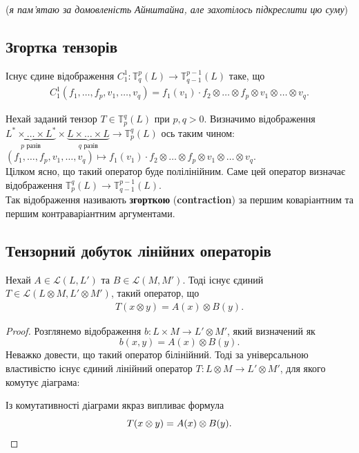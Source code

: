 \documentclass{math_library}
\begin{document}
(\textit{я пам'ятаю за домовленість Айнштайна, але захотілось підкреслити цю суму})

\subsection{Згортка тензорів}
\begin{proposition}
Існує єдине відображення $C_1^1 \colon \mathbb{T}_q^p(L) \to \mathbb{T}_{q-1}^{p-1}(L)$ таке, що
\begin{align*}
C_1^1(f_1,\dots,f_p,v_1,\dots,v_q) = f_1(v_1) \cdot f_2 \otimes \dots \otimes f_p \otimes v_1 \otimes \dots \otimes v_q.
\end{align*}
\end{proposition}

Нехай заданий тензор $T \in \mathbb{T}_p^q(L)$ при $p,q>0$. Визначимо відображення $\underbrace{L^* \times \dots \times L^*}_{p \text{ разів}} \times \underbrace{L \times \dots \times L}_{q \text{ разів}} \to \mathbb{T}_p^q(L)$ ось таким чином:\\
$(f_1,\dots,f_p, v_1,\dots,v_q) \mapsto f_1(v_1) \cdot f_2 \otimes \dots \otimes f_p \otimes v_1 \otimes \dots \otimes v_q$.\\
Цілком ясно, що такий оператор буде полілінійним. Саме цей оператор визначає відображення $\mathbb{T}_p^q(L) \to \mathbb{T}_{q-1}^{p-1}(L)$.\\
Так відображення називають \textbf{згорткою} (\textbf{contraction}) за першим коваріантним та першим контраваріантним аргументами.

\subsection{Тензорний добуток лінійних операторів}
\begin{proposition}
Нехай $A \in \mathcal{L}(L,L')$ та $B \in \mathcal{L}(M,M')$. Тоді існує єдиний $T \in \mathcal{L}(L \otimes M, L' \otimes M')$, такий оператор, що
\begin{align*}
T(x \otimes y) = A(x) \otimes B(y).
\end{align*}
\end{proposition}

\begin{proof}
Розглянемо відображення $b \colon L \times M \to L' \otimes M'$, який визначений як
\[
b(x,y) = A(x) \otimes B(y).
\]
Неважко довести, що такий оператор білінійний. Тоді за універсальною властивістю існує єдиний лінійний оператор $T \colon L \otimes M \to L' \otimes M'$, для якого комутує діаграма:
\begin{figure}[H]
\centering
{}
\end{figure}
Із комутативності діаграми якраз випливає формула
\[
T(x \otimes y) = A(x) \otimes B(y). \qedhere
\]
\end{proof}
\end{document}
